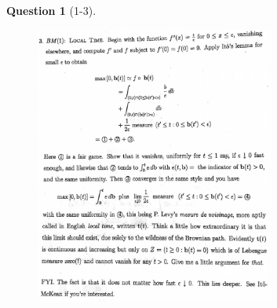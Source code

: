\documentclass[11pt]{article}
\theoremstyle{plain}
\theoremstyle{quest}
\newtheorem*{question}{Question}
\begin{document}
\begin{question}[1-3]
\hfill
\begin{figure}[h!]
  \centering
    \includegraphics[width=0.7\textwidth]{limthm2-f-p3.png}
\end{figure}
\end{question}
\end{document}
